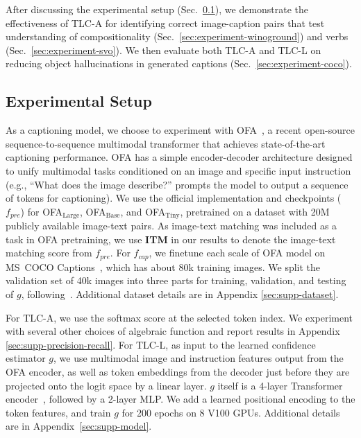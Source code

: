 \documentclass[10pt,twocolumn,letterpaper]{article}
\newcommand{\secref}[1]{Sec.\xspace~\ref{#1}}
\newcommand{\ApproachName}{TLC\xspace}
\newcommand{\OFALarge}{OFA$_{\text{Large}}$\xspace}
\newcommand{\OFABase}{OFA$_{\text{Base}}$\xspace}
\newcommand{\OFATiny}{OFA$_{\text{Tiny}}$\xspace}
\begin{document}
After discussing the experimental setup (\secref{sec:experiment-setup}), we demonstrate the effectiveness of \ApproachName-A for identifying correct image-caption pairs that test understanding of compositionality (\secref{sec:experiment-winoground}) and verbs (\secref{sec:experiment-svo}). We then evaluate both \ApproachName-A and \ApproachName-L on reducing object hallucinations in generated captions (\secref{sec:experiment-coco}).

\subsection{Experimental Setup}
\label{sec:experiment-setup}

As a captioning model, we choose to experiment with OFA~\cite{ofa}, a recent open-source sequence-to-sequence multimodal transformer that achieves state-of-the-art captioning performance. OFA has a simple encoder-decoder architecture designed to unify multimodal tasks conditioned on an image and specific input instruction (e.g., ``What does the image describe?'' prompts the model to output a sequence of tokens for captioning). We use the official implementation and checkpoints ($f_{\mathit{pre}}$) for \OFALarge, \OFABase, and \OFATiny, pretrained on a dataset with 20M publicly available image-text pairs. As image-text matching was included as a task in OFA pretraining, we use \textbf{ITM} in our results to denote the image-text matching score from $f_{\mathit{pre}}$. For $f_{\mathit{cap}}$, we finetune each scale of OFA model on MS~COCO Captions~\cite{chen2015microsoft}, which has about 80k training images. We split the validation set of 40k images into three parts for training, validation, and testing of $g$, following~\cite{whitehead2022reliable}. Additional dataset details are in Appendix \ref{sec:supp-dataset}.


For \ApproachName-A, we use the softmax score at the selected token index. We experiment with several other choices of algebraic function and report results in Appendix \ref{sec:supp-precision-recall}. For \ApproachName-L, as input to the learned confidence estimator $g$, we use multimodal image and instruction features output from the OFA encoder, as well as token embeddings from the decoder just before they are projected onto the logit space by a linear layer. $g$ itself is a 4-layer Transformer encoder~\cite{vaswani2017attention}, followed by a 2-layer MLP. We add a learned positional encoding to the token features, and train $g$ for 200 epochs on 8 V100 GPUs. Additional details are in Appendix~\ref{sec:supp-model}.
\end{document}

